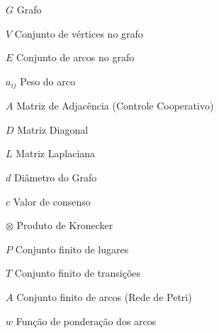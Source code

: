 
\begin{simbolos} \itemsep -1pt
	\item[$ G $] Grafo
	\item[$ V $] Conjunto de vértices no grafo
	\item[$ E $] Conjunto de arcos no grafo
	\item[$ a_{ij} $] Peso do arco
	\item[$ A $] Matriz de Adjacência (Controle Cooperativo)
	\item[$ D $] Matriz Diagonal
	\item[$ L $] Matriz Laplaciana
	\item[$ d $] Diâmetro do Grafo
	\item[$ c $] Valor de consenso
	\item[$ \otimes $] Produto de Kronecker
	\item[$ P $] Conjunto finito de lugares
	\item[$ T $] Conjunto finito de transições
	\item[$ A $] Conjunto finito de arcos (Rede de Petri)
	\item[$ w $] Função de ponderação dos arcos
	
\end{simbolos}